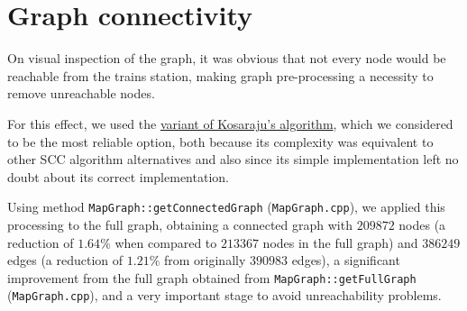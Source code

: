 \chapter{Graph connectivity} \label{connectivity-graphs}
On visual inspection of the graph, it was obvious that not every node would be reachable from the trains station, making graph pre-processing a necessity to remove unreachable nodes.\par
For this effect, we used the \hyperref[algorithm-scc-kosaraju-v]{variant of Kosaraju's algorithm}, which we considered to be the most reliable option, both because its complexity was equivalent to other \acrshort{SCC} algorithm alternatives and also since its simple implementation left no doubt about its correct implementation.\par
Using method \texttt{MapGraph::getConnectedGraph} (\texttt{MapGraph.cpp}), we applied this processing to the full graph, obtaining a connected graph with $209872$ nodes (a reduction of $1.64\%$ when compared to $213367$ nodes in the full graph) and $386249$ edges (a reduction of $1.21\%$ from originally $390983$ edges), a significant improvement from the full graph obtained from \texttt{MapGraph::getFullGraph} (\texttt{MapGraph.cpp}), and a very important stage to avoid unreachability problems.